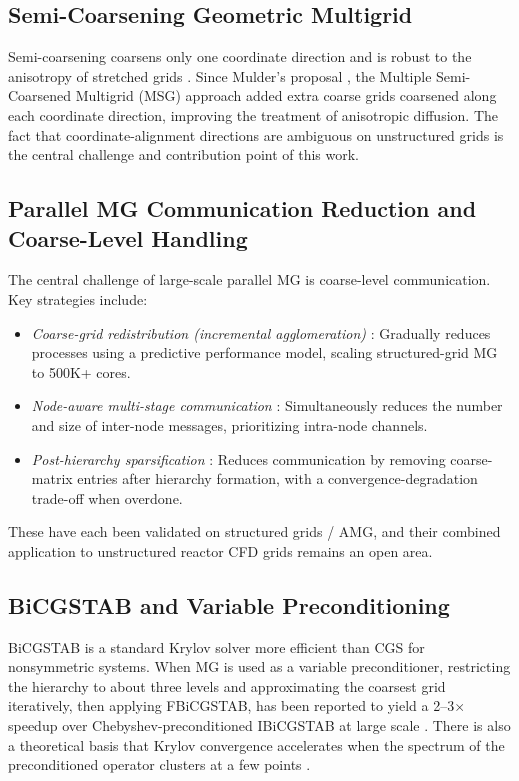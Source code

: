 \documentclass[review]{elsarticle}
\begin{document}
\subsection{Semi-Coarsening Geometric Multigrid}
Semi-coarsening coarsens only one coordinate direction and is robust to the anisotropy of stretched grids \cite{osti440722}. Since Mulder's proposal \cite{mulder1989}, the Multiple Semi-Coarsened Multigrid (MSG) approach \cite{dendy2019msg} added extra coarse grids coarsened along each coordinate direction, improving the treatment of anisotropic diffusion. The fact that coordinate-alignment directions are ambiguous on unstructured grids is the central challenge and contribution point of this work.

\subsection{Parallel MG Communication Reduction and Coarse-Level Handling}
The central challenge of large-scale parallel MG is coarse-level communication. Key strategies include:
\begin{itemize}
  \item \emph{Coarse-grid redistribution (incremental agglomeration)} \cite{reisner2018}: Gradually reduces processes using a predictive performance model, scaling structured-grid MG to 500K+ cores.
  \item \emph{Node-aware multi-stage communication} \cite{bienz2020}: Simultaneously reduces the number and size of inter-node messages, prioritizing intra-node channels.
  \item \emph{Post-hierarchy sparsification} \cite{manteuffel2016}: Reduces communication by removing coarse-matrix entries after hierarchy formation, with a convergence-degradation trade-off when overdone.
\end{itemize}
These have each been validated on structured grids / AMG, and their combined application to unstructured reactor CFD grids remains an open area.

\subsection{BiCGSTAB and Variable Preconditioning}
BiCGSTAB \cite{vandervorst1992} is a standard Krylov solver more efficient than CGS for nonsymmetric systems. When MG is used as a variable preconditioner, restricting the hierarchy to about three levels and approximating the coarsest grid iteratively, then applying FBiCGSTAB, has been reported to yield a 2--3$\times$ speedup over Chebyshev-preconditioned IBiCGSTAB at large scale \cite{chen2016fbicgstab}. There is also a theoretical basis that Krylov convergence accelerates when the spectrum of the preconditioned operator clusters at a few points \cite{lucerolorca2026}.
\end{document}
